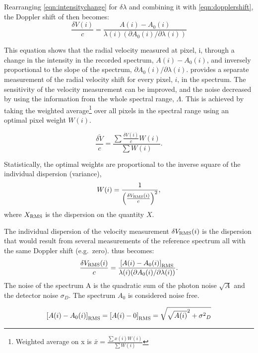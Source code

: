 Rearranging \cref{eqn:intensitychange} for \(\delta \lambda\) and combining it with \cref{eqn:dopplershift}, the Doppler shift of then becomes:
\begin{equation}
    \frac{\delta V(i)}{c} = \frac{A(i) - A_0(i) }{\lambda(i) (\partial A_0(i)/\partial \lambda(i))} \label{eqn:delta_v_i}
\end{equation}

This equation shows that the radial velocity measured at pixel, i, through a change in the intensity in the recorded spectrum, \(A(i)-A_0(i)\), and inversely proportional to the slope of the spectrum, \({\partial A_0(i)}/{\partial \lambda(i)}\).
 provides a separate measurement of the radial velocity shift for every pixel, $i$, in the spectrum.
The sensitivity of the velocity measurement can be improved, and the noise decreased by using the information from the whole spectral range, \(\Lambda\).
This is achieved by taking the weighted average\footnote{Weighted average on x is \(\bar{x} = \frac{\sum{ x(i)W(i)}}{\sum {W(i)}}\)} over all pixels in the spectral range using an optimal pixel weight \(W(i)\).

\begin{equation}
\bar{\frac{\delta V}{c}} = \frac{\sum{\frac{\delta V(i)}{c}W(i)}}{\sum {W(i)}}.
\end{equation}

Statistically, the optimal weights are proportional to the inverse square of the individual dispersion (variance),
\begin{equation}
W(i) = \frac{1}{{\left(\frac{\delta V_{\textrm{RMS}}(i)}{c}\right)}^{2}}, \label{eqn:weights}
\end{equation}
where \(X_{\textrm{RMS}}\) is the dispersion on the quantity \(X\).

The individual dispersion of the velocity measurement \(\delta V_{\textrm{RMS}}(i)\) is the dispersion that would result from several measurements of the reference spectrum all with the same Doppler shift (e.g.\ zero).  thus becomes:
\begin{equation}
    \frac{\delta V_{\textrm{RMS}}(i)}{c} = \frac{{[A(i) - A_0(i)]}_{\textrm{RMS}} }{\lambda(i) (\partial A_0(i)/\partial \lambda(i))}. \label{eqn:delta_v_i_rms}
\end{equation}
The noise of the spectrum A is the quadratic sum of the photon noise \(\sqrt{A}\) and the detector noise \(\sigma_D\).
The spectrum \(A_0\) is considered noise free.

\begin{equation}
{[{A(i)-A_0(i)}]}_{\textrm{RMS}} = {[{A(i)} - 0]}_{\textrm{RMS}} = \sqrt{{\sqrt{A(i)}}^{2} + {{\sigma}^{2}}_{D}} \label{eqn:noise}
\end{equation}


